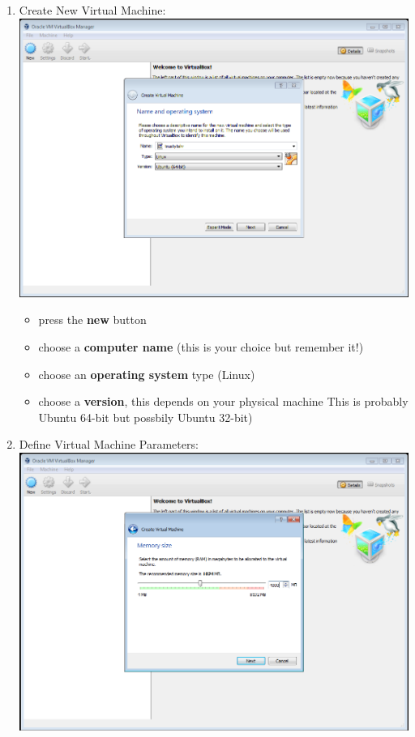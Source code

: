 \documentclass[12pt]{article}
\begin{document}
\begin{description}
\begin{enumerate}
\begin{itemize}
            \end{itemize}
	\newpage
	\item Create New Virtual Machine: \vspace{20mm} \\
      		\includegraphics[scale=.6]{Capture2.png}\\
               \begin{itemize}
                
	\item press the {\bf new} button
                \item choose a {\bf computer name} (this is your choice but remember it!)
                \item choose an {\bf operating system} type (Linux)
                \item choose a {\bf version}, this depends on your physical machine This is probably Ubuntu 64-bit but possbily Ubuntu 32-bit) 
                
            \end{itemize}
	\newpage
\item Define Virtual Machine Parameters: \vspace{20mm} \\
      		\includegraphics[scale=.6]{Capture3.png}\\
            \begin{itemize}
                

\end{itemize}
\end{enumerate}
\end{description}
\end{document}
